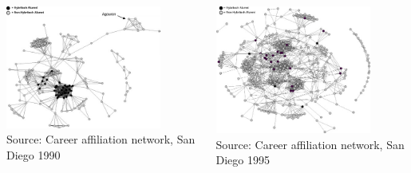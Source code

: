 \documentclass[8pt]{beamer}
\begin{document}


\begin{frame}[fragile]
\frametitle{\insertsection}
\framesubtitle{\insertsubsection}

\begin{columns}[c]

\centering
\includegraphics[width = 0.8\textwidth]{network_emergence_3}\\
\tiny Source: Career affiliation network, San Diego 1990 \cite{Casper2007}

\centering
\includegraphics[width = 0.8\textwidth]{network_emergence_4}\\
\tiny Source: Career affiliation network, San Diego 1995 \cite{Casper2007}

\end{columns}

\end{frame}
\end{document}
